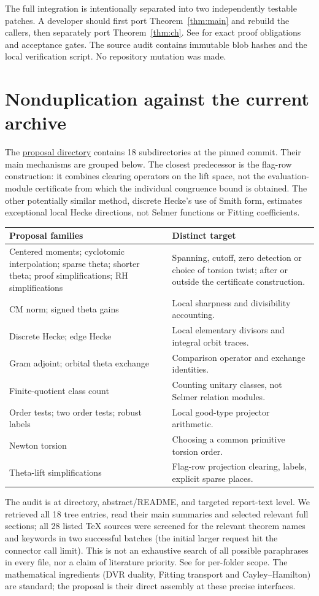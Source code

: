 \documentclass[11pt]{article}
\newcommand{\propdir}{\href{https://github.com/VladimirReshetnikov/ProveIt/tree/9050b04000647d588d0c78d945180abcd3b0bcf7/Analysis/GeneralizedRiemannHypothesis/docs/proposals}{proposal directory}}
\begin{document}
The full integration is intentionally separated into two independently testable patches. A developer should first port Theorem~\ref{thm:main} and rebuild the callers, then separately port Theorem~\ref{thm:ch}. See  for exact proof obligations and acceptance gates. The source audit contains immutable blob hashes and the local verification script. No repository mutation was made.
\section{Nonduplication against the current archive}
The \propdir{} contains 18 subdirectories at the pinned commit. Their main mechanisms are grouped below. The closest predecessor is the flag-row construction: it combines clearing operators on the lift space, not the evaluation-module certificate from which the individual congruence bound is obtained. The other potentially similar method, discrete Hecke's use of Smith form, estimates exceptional local Hecke directions, not Selmer functions or Fitting coefficients.
\begin{center}\small
\begin{tabularx}{\linewidth}{@{}p{.48\linewidth}X@{}}\toprule
Proposal families & Distinct target \\\midrule
Centered moments; cyclotomic interpolation; sparse theta; shorter theta; proof simplifications; RH simplifications & Spanning, cutoff, zero detection or choice of torsion twist; after or outside the certificate construction.\\
CM norm; signed theta gains & Local sharpness and divisibility accounting.\\
Discrete Hecke; edge Hecke & Local elementary divisors and integral orbit traces.\\
Gram adjoint; orbital theta exchange & Comparison operator and exchange identities.\\
Finite-quotient class count & Counting unitary classes, not Selmer relation modules.\\
Order tests; two order tests; robust labels & Local good-type projector arithmetic.\\
Newton torsion & Choosing a common primitive torsion order.\\
Theta-lift simplifications & Flag-row projection clearing, labels, explicit sparse places.\\\bottomrule
\end{tabularx}
\end{center}
The audit is at directory, abstract/README, and targeted report-text level. We retrieved all 18 tree entries, read their main summaries and selected relevant full sections; all 28 listed TeX sources were screened for the relevant theorem names and keywords in two successful batches (the initial larger request hit the connector call limit). This is not an exhaustive search of all possible paraphrases in every file, nor a claim of literature priority. See  for per-folder scope. The mathematical ingredients (DVR duality, Fitting transport and Cayley--Hamilton) are standard; the proposal is their direct assembly at these precise interfaces.
\end{document}
